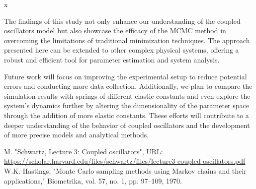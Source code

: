 x\documentclass[12pt, a4paper, reprint, nofootinbib, twoside,  showkeys]{revtex4-1}
\begin{document}
The findings of this study not only enhance our understanding of the coupled oscillators model but also showcase the efficacy of the MCMC method in overcoming the limitations of traditional minimization techniques. The approach presented here can be extended to other complex physical systems, offering a robust and efficient tool for parameter estimation and system analysis.

Future work will focus on improving the experimental setup to reduce potential errors and conducting more data collection. Additionally, we plan to compare the simulation results with springs of different elastic constants and even explore the system's dynamics further by altering the dimensionality of the parameter space through the addition of more elastic constants. These efforts will contribute to a deeper understanding of the behavior of coupled oscillators and the development of more precise models and analytical methods.


	



	
	
	\begin{thebibliography}{4}
		  M. "Schwartz, Lecture 3: Coupled oscillators", URL: \url{https://scholar.harvard.edu/files/schwartz/files/lecture3-coupled-oscillators.pdf}
		 W.K. Hastings, "Monte Carlo sampling methods using Markov chains and their applications," Biometrika, vol. 57, no. 1, pp. 97–109, 1970.

		
		
	\end{thebibliography}
	
\end{document}
